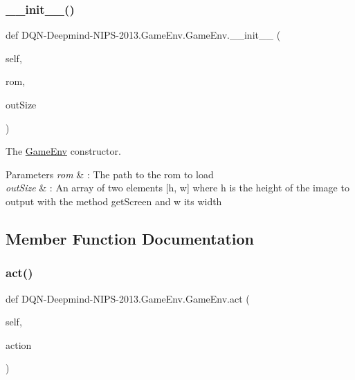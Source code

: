 \subsubsection{\texorpdfstring{\+\_\+\+\_\+init\+\_\+\+\_\+()}{\_\_init\_\_()}}
{\footnotesize\ttfamily def D\+QN-\/Deepmind-\/N\+I\+PS-\/2013.Game\+Env.\+Game\+Env.\+\_\+\+\_\+init\+\_\+\+\_\+ (\begin{DoxyParamCaption}\item[{}]{self,  }\item[{}]{rom,  }\item[{}]{out\+Size }\end{DoxyParamCaption})}



The \hyperlink{classDQN-Deepmind-NIPS-2013_1_1GameEnv_1_1GameEnv}{Game\+Env} constructor. 


\begin{DoxyParams}{Parameters}
{\em rom} & \+: The path to the rom to load \\
\hline
{\em out\+Size} & \+: An array of two elements \mbox{[}h, w\mbox{]} where h is the height of the image to output with the method get\+Screen and w its width \\
\hline
\end{DoxyParams}


\subsection{Member Function Documentation}
\hypertarget{classDQN-Deepmind-NIPS-2013_1_1GameEnv_1_1GameEnv_a675bec246ea3ed4506328deb5df64d4e}{}\label{classDQN-Deepmind-NIPS-2013_1_1GameEnv_1_1GameEnv_a675bec246ea3ed4506328deb5df64d4e} 
\subsubsection{\texorpdfstring{act()}{act()}}
{\footnotesize\ttfamily def D\+QN-\/Deepmind-\/N\+I\+PS-\/2013.Game\+Env.\+Game\+Env.\+act (\begin{DoxyParamCaption}\item[{}]{self,  }\item[{}]{action }\end{DoxyParamCaption})}



